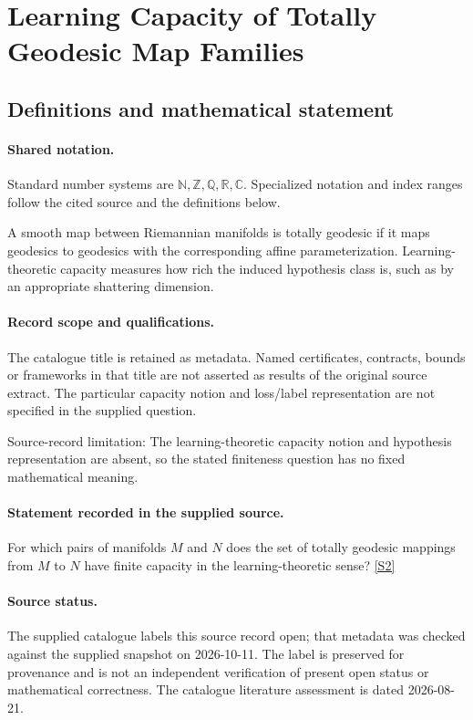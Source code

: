 \documentclass[11pt]{article}
\newcommand{\sref}[2]{\hyperlink{source:#1:#2}{[S#2]}}
\begin{document}
\section{Learning Capacity of Totally Geodesic Map Families}\label{statement}

\subsection{Definitions and mathematical statement}

\paragraph{Shared notation.}Standard number systems are $\mathbb N,\mathbb Z,\mathbb Q,\mathbb R,\mathbb C$. Specialized notation and index ranges follow the cited source and the definitions below.


A smooth map between Riemannian manifolds is totally geodesic if it maps geodesics to geodesics with the corresponding affine parameterization. Learning-theoretic capacity measures how rich the induced hypothesis class is, such as by an appropriate shattering dimension.
\paragraph{Record scope and qualifications.}
The catalogue title is retained as metadata. Named certificates, contracts, bounds or frameworks in that title are not asserted as results of the original source extract.
The particular capacity notion and loss/label representation are not specified in the supplied question.

Source-record limitation: The learning-theoretic capacity notion and hypothesis representation are absent, so the stated finiteness question has no fixed mathematical meaning.
\paragraph{Statement recorded in the supplied source.}
For which pairs of manifolds $M$ and $N$ does the set of totally geodesic mappings from $M$ to $N$ have finite capacity in the learning-theoretic sense? \sref{statement}{2}
\paragraph{Source status.}
The supplied catalogue labels this source record open; that metadata was checked against the supplied snapshot on 2026-10-11. The label is preserved for provenance and is not an independent verification of present open status or mathematical correctness. The catalogue literature assessment is dated 2026-08-21.
\end{document}
